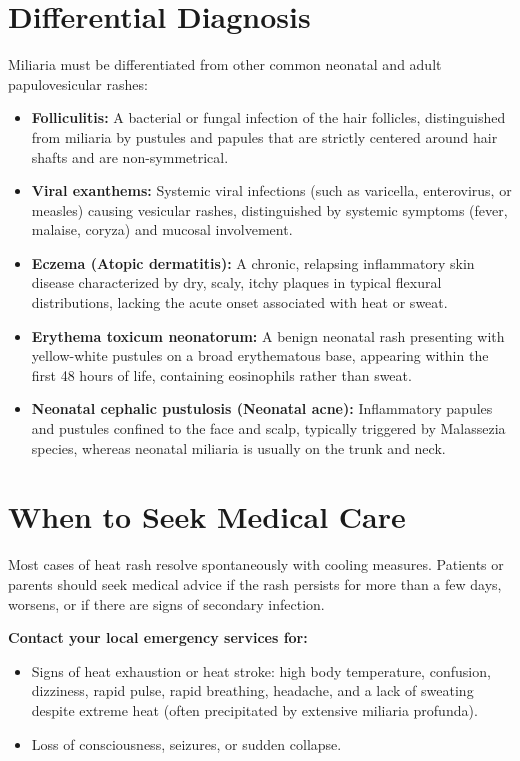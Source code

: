 \section*{Differential Diagnosis}
Miliaria must be differentiated from other common neonatal and adult papulovesicular rashes:
\begin{itemize}
    \item \textbf{Folliculitis:} A bacterial or fungal infection of the hair follicles, distinguished from miliaria by pustules and papules that are strictly centered around hair shafts and are non-symmetrical.
    \item \textbf{Viral exanthems:} Systemic viral infections (such as varicella, enterovirus, or measles) causing vesicular rashes, distinguished by systemic symptoms (fever, malaise, coryza) and mucosal involvement.
    \item \textbf{Eczema (Atopic dermatitis):} A chronic, relapsing inflammatory skin disease characterized by dry, scaly, itchy plaques in typical flexural distributions, lacking the acute onset associated with heat or sweat.
    \item \textbf{Erythema toxicum neonatorum:} A benign neonatal rash presenting with yellow-white pustules on a broad erythematous base, appearing within the first 48 hours of life, containing eosinophils rather than sweat.
    \item \textbf{Neonatal cephalic pustulosis (Neonatal acne):} Inflammatory papules and pustules confined to the face and scalp, typically triggered by Malassezia species, whereas neonatal miliaria is usually on the trunk and neck.
\end{itemize}

\section*{When to Seek Medical Care}
Most cases of heat rash resolve spontaneously with cooling measures. Patients or parents should seek medical advice if the rash persists for more than a few days, worsens, or if there are signs of secondary infection.

\textbf{Contact your local emergency services for:}
\begin{itemize}
    \item Signs of heat exhaustion or heat stroke: high body temperature, confusion, dizziness, rapid pulse, rapid breathing, headache, and a lack of sweating despite extreme heat (often precipitated by extensive miliaria profunda).
    \item Loss of consciousness, seizures, or sudden collapse.
\end{itemize}


